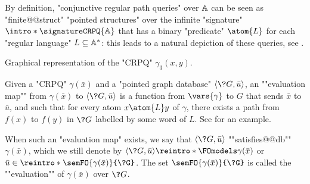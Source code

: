 By definition, "conjunctive regular path queries" over $\A$ can be seen
as "finite@@struct" "pointed structures" over the infinite "signature"
$\intro*\signatureCRPQ{\A}$ that has a binary "predicate" $\atom{L}$ for each "regular language"
$L \subseteq \A^*$: this leads to a natural depiction of these
queries, see .
\begin{marginfigure}
    \centering
    \begin{tikzpicture}
        
    \end{tikzpicture}
    \caption{\AP\label{fig:prelim-db-crpq-as-struct} Graphical representation
    of the "CRPQ" $\gamma_3(x,y)$.}
\end{marginfigure}

\begin{definition}
    Given a "CRPQ" $\gamma(\bar x)$ and a "pointed graph database"
    $\tup{\?G,\bar u}$, an \AP""evaluation map"" from $\gamma(\bar x)$
    to $\tup{\?G, \bar u}$ is a function from $\vars{\gamma}$ to $G$
    that sends $\bar x$ to $\bar u$, and such that for every
    atom $x \atom{L} y$ of $\gamma$, there exists a path from $f(x)$ to
    $f(y)$ in $\?G$ labelled by some word of $L$. See 
    for an example.%

    When such an "evaluation map" exists, we say that $\tup{\?G,\bar u}$
    \AP""satisfies@@db"" $\gamma(\bar x)$, which we still denote by
    $\tup{\?G,\bar u} \reintro*\FOmodels \gamma(\bar x)$
    or $\bar u \in \reintro*\semFO{\gamma(\bar x)}{\?G}$.
    The set $\semFO{\gamma(\bar x)}{\?G}$ is called the ""evaluation""
    of $\gamma(\bar x)$ over $\?G$.
\end{definition}

